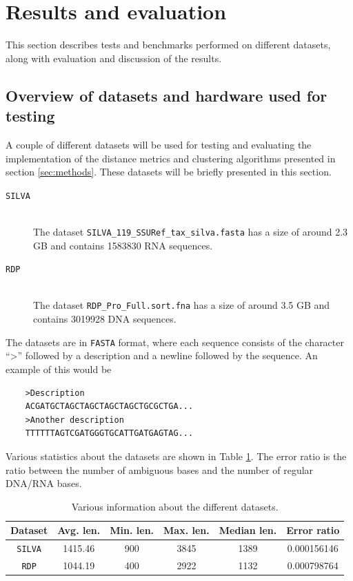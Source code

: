 \section{Results and evaluation} \label{sec:results}

This section describes tests and benchmarks performed on different datasets,
along with evaluation and discussion of the results.

\subsection{Overview of datasets and hardware used for testing}
\label{sec:overview_of_datasets}

A couple of different datasets will be used for testing and evaluating the
implementation of the distance metrics and clustering algorithms presented in
section \ref{sec:methods}. These datasets will be briefly presented in this
section.

\begin{description}
  \item[\texttt{SILVA}] \hfill \\
    The dataset \texttt{SILVA\_119\_SSURef\_tax\_silva.fasta} has a size of
    around 2.3 GB and contains \num{1583830} RNA sequences.

  \item[\texttt{RDP}] \hfill \\
    The dataset \texttt{RDP\_Pro\_Full.sort.fna} has a size of around 3.5 GB
    and contains \num{3019928} DNA sequences.
\end{description}

The datasets are in \texttt{FASTA} format, where each sequence consists of the
character ``>'' followed by a description and a newline followed by the
sequence. An example of this would be
\begin{verbatim}
    >Description
    ACGATGCTAGCTAGCTAGCTAGCTGCGCTGA...
    >Another description
    TTTTTTAGTCGATGGGTGCATTGATGAGTAG...
\end{verbatim}

Various statistics about the datasets are shown in Table \ref{tab:data_stats}.
The error ratio is the ratio between the number of ambiguous bases and the
number of regular DNA/RNA bases.

\begin{table}[H]
  \centering
  \begin{tabular}{c | c | c | c | c | c}
    Dataset        & Avg. len. & Min. len. & Max. len. & Median len. & Error ratio \\
    \hline\hline
    \texttt{SILVA} & \num{1415.46}  & \num{900} & \num{3845} & \num{1389} & 0.000156146 \\
    \texttt{RDP}   & \num{1044.19}  & \num{400} & \num{2922} & \num{1132} & 0.000798764 \\
  \end{tabular}
  \caption{Various information about the different datasets.}
  \label{tab:data_stats}
\end{table}

